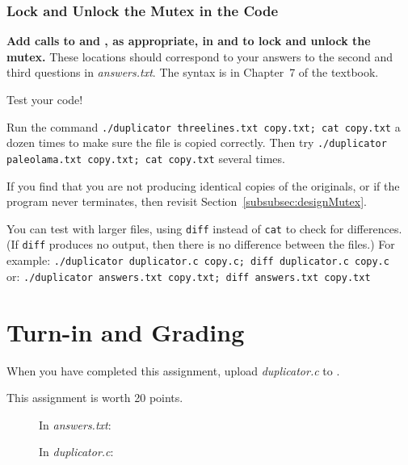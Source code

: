     \subsubsection{Lock and Unlock the Mutex in the Code}

    \textbf{Add calls to  and , as appropriate, in  and  to lock and unlock the mutex.}
    These locations should correspond to your answers to the second and third questions in \textit{answers.txt}.
    The syntax is in Chapter~7 of the textbook.

    Test your code!

    Run the command \texttt{./duplicator threelines.txt copy.txt; cat copy.txt} a dozen times to make sure the file is copied correctly.
    Then try \texttt{./duplicator paleolama.txt copy.txt; cat copy.txt} several times.

    If you find that you are not producing identical copies of the originals, or if the program never terminates, then revisit Section~\ref{subsubsec:designMutex}.

    You can test with larger files, using \texttt{diff} instead of \texttt{cat} to check for differences.
    (If \texttt{diff} produces no output, then there is no difference between the files.)
    For example: \texttt{./duplicator duplicator.c copy.c; diff duplicator.c copy.c} \\
    or: \texttt{./duplicator answers.txt copy.txt; diff answers.txt copy.txt}


    \section{Turn-in and Grading}

    When you have completed this assignment, upload \textit{duplicator.c} to
    \filesubmission.

    This assignment is worth 20 points. \\

    \begin{description}
        \item[] In \textit{answers.txt}:
        \item[] In \textit{duplicator.c}:
    \end{description}

